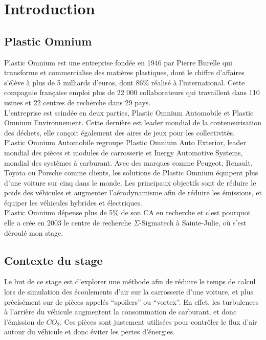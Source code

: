 \chapter{Introduction}
\section{Plastic Omnium}

Plastic Omnium est une entreprise fondée en 1946 par Pierre Burelle qui transforme et commercialise des matières plastiques, dont le chiffre d'affaires s'élève à plus de 5 milliards d'euros, dont 86\% réalisé à l'international. Cette compagnie française emploi plus de 22 000 collaborateurs qui travaillent dans 110 usines et 22 centres de recherche dans 29 pays.\\

L'entreprise est scindée en deux parties, Plastic Omnium Automobile et Plastic Omnium Environnement. Cette dernière est leader mondial de la conteneurisation des déchets, elle conçoit également des aires de jeux pour les collectivités.\\
Plastic Omnium Automobile regroupe Plastic Omnium Auto Exterior, leader mondial des pièces et modules de carrosserie et Inergy Automotive Systems,  mondial des systèmes à carburant. Avec des marques comme Peugeot, Renault, Toyota ou Porsche comme clients, les solutions de Plastic Omnium équipent plus d'une voiture sur cinq dans le monde. Les principaux objectifs sont de réduire le poids des véhicules et augmenter l'aérodynamisme afin de réduire les émissions, et équiper les véhicules hybrides et électriques. \\

Plastic Omnium dépense plus de 5\% de son CA en recherche et c'est pourquoi elle a crée en 2003 le centre de recherche $\Sigma$-Sigmatech à Sainte-Julie, où s'est déroulé mon stage.\\


\section{Contexte du stage}

Le but de ce stage est d'explorer une méthode afin de réduire le temps de calcul lors de simulation des écoulements d'air sur la carrosserie d'une voiture, et plus précisément sur de pièces appelés ``spoilers'' ou ``vortex''. En effet, les turbulences à l'arrière du véhicule augmentent la consommation de carburant, et donc l'émission de $CO_2$. Ces pièces sont justement utilisées pour contrôler le flux d'air autour du véhicule et donc éviter les pertes d'énergies.\\

